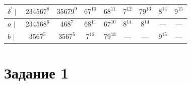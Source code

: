 \documentclass[fleqn,12pt, a4paper]{article}
\begin{document}
\begin{enumerate}[label=(\roman{*})]
	\vspace{1em} 
	
	\begin{tabular}{lcccccccc}
		\toprule
		\multicolumn{1}{c}{
			$\delta^\prime \mid$
		} 
		& \multicolumn{1}{c}{ $234567^8$ }
		& \multicolumn{1}{c}{ $35679^9$ }
		& \multicolumn{1}{c}{ $67^{10}$ }
		& \multicolumn{1}{c}{ $68^{11}$ }
		& \multicolumn{1}{c}{ $7^{12}$ }
		& \multicolumn{1}{c}{ $79^{13}$ }
		& \multicolumn{1}{c}{ $8^{14}$ }
		& \multicolumn{1}{c}{ $9^{15}$ }
		
		\\
		\midrule
		
		$a$ $\mid$ &
		$234568^6$ & $468^7$ & $68^{11}$ & $67^{10}$ & $8^{14}$ & $8^{14}$ & --- & ---   \\
		$b$ $\mid$ &
		$3567^5$ & $3567^5$ & $7^{12}$ & $79^{13}$ & --- & --- & $9^{15}$ & --- \\ 		
		\bottomrule
	\end{tabular}
	
\end{enumerate}

\section*{Задание 1}
\end{document}
